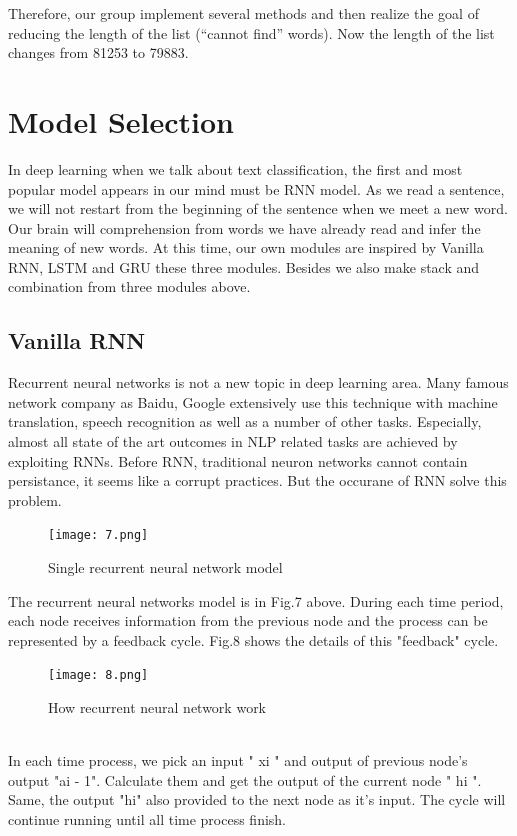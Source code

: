\documentclass{article}
\begin{document}
\noindent Therefore, our group implement several methods and then realize  the goal of reducing the length of the list (“cannot find” words). Now the length of the list changes from 81253 to 79883.

\section{ Model Selection}
\noindent In deep learning when we talk about text classification,
the first and most popular model appears in our mind must be RNN model. As we read a sentence, we will not restart from the beginning of the sentence when we meet a new word. Our brain will comprehension from words we have already read and infer the meaning of new words. At this time, our own modules are inspired by Vanilla RNN, LSTM and GRU these three modules. Besides we also make stack and combination from three modules above.
\subsection{Vanilla RNN}
\noindent Recurrent neural networks is not a new topic in deep learning area. Many famous network company as Baidu, Google extensively use this technique with machine translation, speech recognition as well as a number of other tasks. Especially, almost all state of the art outcomes in NLP related tasks are achieved by exploiting RNNs. Before RNN, traditional neuron networks cannot contain persistance, it seems like a corrupt practices. But the occurane of RNN solve this problem.
\begin{figure}[H]
	\centering
	\texttt{[image: 7.png]}
	\caption{Single recurrent neural network model}
\end{figure}
\noindent The recurrent neural networks model is in Fig.7 above. During each time period, each node receives information from the previous node and the process can be represented by a feedback cycle. Fig.8 shows the details of this "feedback" cycle.
\begin{figure}[h]
	\centering
	\texttt{[image: 8.png]}
	\caption{How recurrent neural network work}
\end{figure}\\
\noindent In each time process, we pick an input " xi " and output of previous node's output "ai - 1". Calculate them and get the output of the current node " hi ". Same, the output "hi" also provided to the next node as it's input. The cycle will continue running until all time process finish.\\
\end{document}
